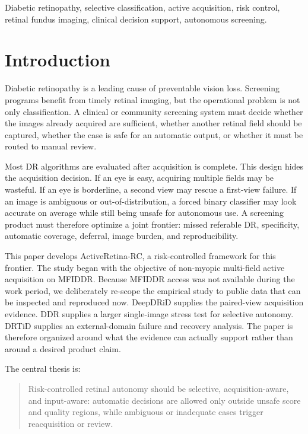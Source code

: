 \documentclass[journal]{IEEEtran}
\begin{document}
\begin{IEEEkeywords}
Diabetic retinopathy, selective classification, active acquisition, risk control, retinal fundus imaging, clinical decision support, autonomous screening.
\end{IEEEkeywords}

\section{Introduction}
Diabetic retinopathy is a leading cause of preventable vision loss. Screening programs benefit from timely retinal imaging, but the operational problem is not only classification. A clinical or community screening system must decide whether the images already acquired are sufficient, whether another retinal field should be captured, whether the case is safe for an automatic output, or whether it must be routed to manual review.

Most DR algorithms are evaluated after acquisition is complete. This design hides the acquisition decision. If an eye is easy, acquiring multiple fields may be wasteful. If an eye is borderline, a second view may rescue a first-view failure. If an image is ambiguous or out-of-distribution, a forced binary classifier may look accurate on average while still being unsafe for autonomous use. A screening product must therefore optimize a joint frontier: missed referable DR, specificity, automatic coverage, deferral, image burden, and reproducibility.

This paper develops ActiveRetina-RC, a risk-controlled framework for this frontier. The study began with the objective of non-myopic multi-field active acquisition on MFIDDR. Because MFIDDR access was not available during the work period, we deliberately re-scope the empirical study to public data that can be inspected and reproduced now. DeepDRiD supplies the paired-view acquisition evidence. DDR supplies a larger single-image stress test for selective autonomy. DRTiD supplies an external-domain failure and recovery analysis. The paper is therefore organized around what the evidence can actually support rather than around a desired product claim.

The central thesis is:
\begin{quote}
Risk-controlled retinal autonomy should be selective, acquisition-aware, and input-aware: automatic decisions are allowed only outside unsafe score and quality regions, while ambiguous or inadequate cases trigger reacquisition or review.
\end{quote}
\end{document}

